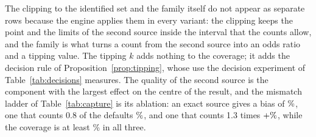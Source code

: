The clipping to the identified set and the family itself do not appear as separate rows because the engine applies them in every variant: the clipping keeps the point and the limits of the second source inside the interval that the counts allow, and the family is what turns a count from the second source into an odds ratio and a tipping value. The tipping $k$ adds nothing to the coverage; it adds the decision rule of Proposition~\ref{prop:tipping}, whose use the decision experiment of Table~\ref{tab:decisions} measures. The quality of the second source is the component with the largest effect on the centre of the result, and the mismatch ladder of Table~\ref{tab:capture} is its ablation: an exact source gives a bias of $\nv{bias.fy.i9.anchored}\%$, one that counts 0.8 of the defaults $\nv{cap.i9.c0.8.bias}\%$, and one that counts 1.3 times $+\nv{cap.i9.c1.3.abias}\%$, while the coverage is at least \% in all three.
